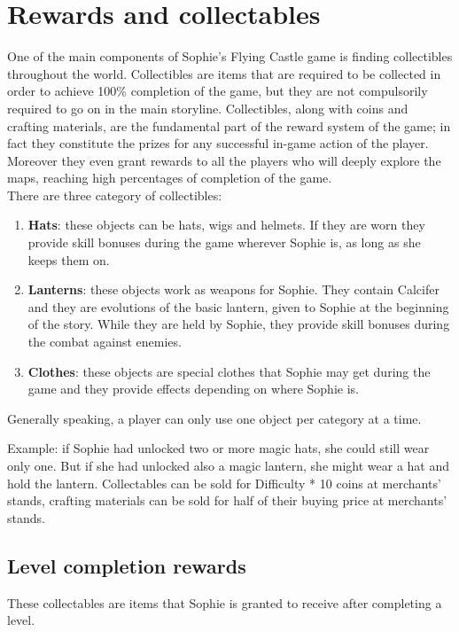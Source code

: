 \section{Rewards and collectables}
One of the main components of Sophie's Flying Castle game is finding collectibles throughout the world.
Collectibles are items that are required to be collected in order to achieve 100\%
completion of the game, but they are not compulsorily required to go on in the main storyline. Collectibles, along with coins and crafting materials, are the fundamental part of the reward system of the game; in fact they constitute the prizes for any successful in-game action of the player. Moreover they even grant rewards to all the players who will deeply explore the maps, reaching high percentages of completion of the game.\\

There are three category of collectibles:
\begin{enumerate}
\item \textbf{Hats}: these objects can be hats, wigs and helmets. If they are worn they provide skill bonuses during the game wherever Sophie is, as long as she keeps them on.
\item \textbf{Lanterns}: these objects work as weapons for Sophie. They contain Calcifer and they are evolutions of the basic lantern, given to Sophie at the beginning of the story. While they are held by Sophie, they provide skill bonuses during the combat against enemies. 
\item \textbf{Clothes}: these objects are special clothes that Sophie may get during the game and they provide effects depending on where Sophie is.  
  \end{enumerate}

Generally speaking, a player can only use one object per category at a time.

Example: if Sophie had unlocked two or more magic hats, she could still wear only one. But if she had unlocked also a magic lantern, she might wear a hat and hold the lantern.
Collectables can be sold for Difficulty * 10 coins at merchants' stands, crafting materials can be sold for half of their buying price at merchants' stands.


\subsection{Level completion rewards}
These collectables are items that Sophie is granted to receive after completing a level.

